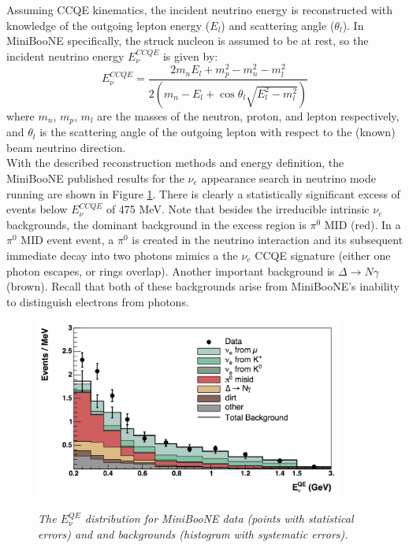 Assuming CCQE kinematics, the incident neutrino energy is reconstructed with knowledge of the outgoing lepton energy ($E_l$) and scattering angle ($\theta_l$). In MiniBooNE specifically, the struck nucleon is assumed to be at rest, so the incident neutrino energy $E_\nu^{CCQE}$ is given by:
\begin{equation}\label{MB_CCQE_formula}
E_\nu^{CCQE} = \frac{2m_nE_l+m_p^2-m_n^2-m_l^2}{2(m_n-E_l+\cos\theta_l\sqrt{E_l^2-m_l^2})}
\end{equation}
where $m_n$, $m_p$, $m_l$ are the masses of the neutron, proton, and lepton respectively, and $\theta_l$ is the scattering angle of the outgoing lepton with respect to the (known) beam neutrino direction.\\

With the described reconstruction methods and energy definition, the MiniBooNE published results \cite{MBLEEPaper} for the $\nu_e$ appearance search in neutrino mode running are shown in Figure \ref{MB_published_stackedhisto_fig}. There is clearly a statistically significant excess of events below $E_\nu^{CCQE}$ of 475 MeV. Note that besides the irreducible intrinsic $\nu_e$ backgrounds, the dominant background in the excess region is $\pi^0$ MID (red). In a $\pi^0$ MID event event, a $\pi^0$ is created in the neutrino interaction and its subsequent immediate decay into two photons mimics a the $\nu_e$ CCQE signature (either one photon escapes, or rings overlap). Another important background is $\Delta\rightarrow N\gamma$ (brown). Recall that both of these backgrounds arise from MiniBooNE's inability to distinguish electrons from photons.\\


\begin{figure}[ht!]
\centering
	\includegraphics[width=0.9\textwidth]{Figures/MB_published_stackedhisto.png} \\
\caption{\textit{The $E_\nu^{QE}$ distribution for MiniBooNE data (points with statistical errors) and and backgrounds (histogram with systematic errors).}}\label{MB_published_stackedhisto_fig}
\end{figure}

